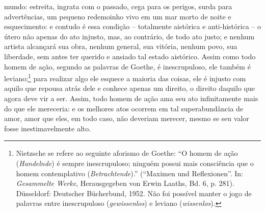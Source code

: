 mundo: estreita, ingrata com o passado, cega para os perigos, surda para
advertências, um pequeno redemoinho vivo em um mar morto de noite e
esquecimento: e contudo é essa condição -- totalmente aistórica e
anti-histórica -- o útero não apenas do ato injusto, mas, ao contrário,
de todo ato justo; e nenhum artista alcançará sua obra, nenhum general,
sua vitória, nenhum povo, sua liberdade, sem antes ter querido e ansiado
tal estado aistórico. Assim como todo homem de ação, segundo as palavras
de Goethe, é inescrupuloso, ele também é leviano;\footnote{Nietz\-sche se refere ao seguinte
  aforismo de Goethe: ``O homem de ação (\emph{Handelnde}) é sempre
  inescrupuloso; ninguém possui mais consciência que o homem
  contemplativo (\emph{Betrachtende}).'' (``Maximen und Reflexionen''.
  In: \emph{Gesammelte Werke}, Herausgegeben von Erwin Laaths, Bd. 6,
  p. 281). Düsseldorf: Deutscher Bücherbund, 1952. Não foi possível
  manter o jogo de palavras entre inescrupuloso (\emph{gewissenlos}) e
  leviano (\emph{wissenlos}).} para realizar algo
ele esquece a maioria das coisas, ele é injusto com aquilo que repousa
atrás dele e conhece apenas um direito, o direito daquilo que agora deve
vir a ser. Assim, todo homem de ação ama seu ato infinitamente mais do
que ele mereceria: e os melhores atos ocorrem em tal superabundância de
amor, amor que eles, em todo caso, não deveriam merecer, mesmo se seu
valor fosse inestimavelmente alto.

